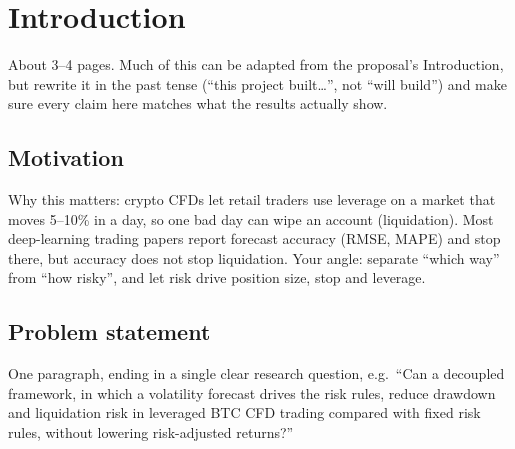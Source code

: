 \chapter{Introduction}\label{ch:intro}

\begin{guide}
About 3--4 pages. Much of this can be adapted from the proposal's Introduction, but rewrite it in the past tense (``this project built\ldots'', not ``will build'') and make sure every claim here matches what the results actually show.
\end{guide}

\section{Motivation}
\begin{guide}
Why this matters: crypto CFDs let retail traders use leverage on a market that moves 5--10\% in a day, so one bad day can wipe an account (liquidation). Most deep-learning trading papers report forecast accuracy (RMSE, MAPE) and stop there, but accuracy does not stop liquidation. Your angle: separate ``which way'' from ``how risky'', and let risk drive position size, stop and leverage.
\end{guide}
\tbc{}

\section{Problem statement}
\begin{guide}
One paragraph, ending in a single clear research question, e.g.\ ``Can a decoupled framework, in which a volatility forecast drives the risk rules, reduce drawdown and liquidation risk in leveraged BTC CFD trading compared with fixed risk rules, without lowering risk-adjusted returns?''
\end{guide}
\tbc{}


